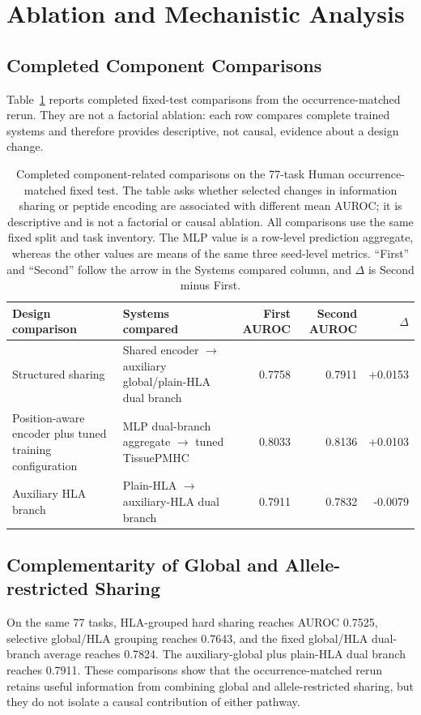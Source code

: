 \section{Ablation and Mechanistic Analysis}

\subsection{Completed Component Comparisons}

Table~\ref{tab:component-evidence} reports completed fixed-test comparisons from the occurrence-matched rerun. They are not a factorial ablation: each row compares complete trained systems and therefore provides descriptive, not causal, evidence about a design change.

\begin{table}[t]
\centering
\caption{Completed component-related comparisons on the 77-task Human occurrence-matched fixed test. The table asks whether selected changes in information sharing or peptide encoding are associated with different mean AUROC; it is descriptive and is not a factorial or causal ablation. All comparisons use the same fixed split and task inventory. The MLP value is a row-level prediction aggregate, whereas the other values are means of the same three seed-level metrics. “First” and “Second” follow the arrow in the Systems compared column, and $\Delta$ is Second minus First.}
\label{tab:component-evidence}
\footnotesize
\renewcommand{\arraystretch}{1.18}
\begin{tabularx}{0.94\textwidth}{>{\raggedright\arraybackslash}p{3.2cm}Xrrr}
\toprule
Design comparison & Systems compared & First AUROC & Second AUROC & $\Delta$ \\
\midrule
Structured sharing & Shared encoder $\rightarrow$ auxiliary global/plain-HLA dual branch & 0.7758 & 0.7911 & +0.0153 \\
Position-aware encoder plus tuned training configuration & MLP dual-branch aggregate $\rightarrow$ tuned TissuePMHC & 0.8033 & 0.8136 & +0.0103 \\
Auxiliary HLA branch & Plain-HLA $\rightarrow$ auxiliary-HLA dual branch & 0.7911 & 0.7832 & -0.0079 \\
\bottomrule
\end{tabularx}
\end{table}

\subsection{Complementarity of Global and Allele-restricted Sharing}

On the same 77 tasks, HLA-grouped hard sharing reaches AUROC 0.7525, selective global/HLA grouping reaches 0.7643, and the fixed global/HLA dual-branch average reaches 0.7824. The auxiliary-global plus plain-HLA dual branch reaches 0.7911. These comparisons show that the occurrence-matched rerun retains useful information from combining global and allele-restricted sharing, but they do not isolate a causal contribution of either pathway.
